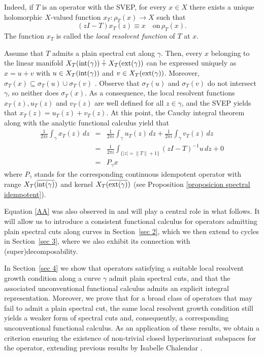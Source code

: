 \documentclass[11pt]{amsart}
\theoremstyle{definition}
\theoremstyle{remark}
\numberwithin{equation}{section}
\newcommand{\inte}{\textnormal{int}}
\newcommand{\exte}{\textnormal{ext}}
\begin{document}
\smallskip

Indeed, if $T$ is an operator with the SVEP, for every $x \in X$ there exists a unique holomorphic $X$-valued function $x_T : \rho_T(x) \to X$ such that
$$
	(zI - T) x_T(z) \equiv x \quad \text{on} \, \rho_T(x).
$$
	The function $x_T$ is called the \emph{local resolvent function} of $T$ at $x$.

\smallskip

Assume that $T$ admits a plain spectral cut along $\gamma$. Then, every $x$ belonging to the linear manifold $X_T(\inte(\gamma))\dotplus X_T(\exte(\gamma))$  can be expressed uniquely as $x = u + v $  with $u \in X_T(\inte(\gamma)) $ and $v \in X_T(\exte(\gamma))$. Moreover, $\sigma_T(x)\subseteq \sigma_T(u)\cup \sigma_T(v)$ \cite[Proposition 1.2.16]{LN00}. Observe that $\sigma_T(u)$ and $\sigma_T(v)$ do not intersect $\gamma$, so neither does $\sigma_T(x)$. As a consequence, the local resolvent functions $x_T(z), u_T(z)$ and $v_T(z)$ are well defined for all $z\in \gamma$, and the SVEP yields that $x_T(z) = u_T(z)+v_T(z)$. At this point, the Cauchy integral theorem along with the analytic functional calculus yield that
	\begin{eqnarray}\label{AA}
		\frac{1}{2\pi i} \int_\gamma x_T(z) \, dz &=& \frac{1}{2\pi i} \int_\gamma u_T(z) \, dz + \frac{1}{2\pi i} \int_\gamma v_T(z) \, dz \nonumber\\
		&= & \frac{1}{2\pi i} \int_{\{|z|=\|T\|+1\}} (zI- T)^{-1} u \, dz + 0 \nonumber\\
		&=& P_\gamma x
	\end{eqnarray}
where $P_\gamma$ stands for the corresponding continuous idempotent operator with range $X_T(\overline{\inte(\gamma)})$ and kernel $X_T(\overline{\exte(\gamma)})$ (see Proposition \ref{proposicion spectral idempotent}).
	
\smallskip

Equation \eqref{AA} was also observed in \cite[Remark 2.2]{AA} and will play a central role in what follows. It will allow us to introduce a consistent functional calculus for operators admitting plain spectral cuts along curves in Section~\ref{sec 2}, which we then extend to cycles in Section~\ref{sec 3}, where we also exhibit its connection with (super)decomposability.

\smallskip

In Section~\ref{sec 4} we show that operators satisfying a suitable local resolvent growth condition along a curve $\gamma$ admit plain spectral cuts, and that the associated unconventional functional calculus admits an explicit integral representation. Moreover, we prove that for a broad class of operators that may fail to admit a plain spectral cut, the same local resolvent growth condition still yields a weaker form of spectral cuts and, consequently, a corresponding unconventional functional calculus. As an application of these results, we obtain a criterion ensuring the existence of non-trivial closed hyperinvariant subspaces for the operator, extending previous results by Isabelle Chalendar \cite{Chalendar1996, Chalendar1997, Chalendar1998}.
	
\end{document}
